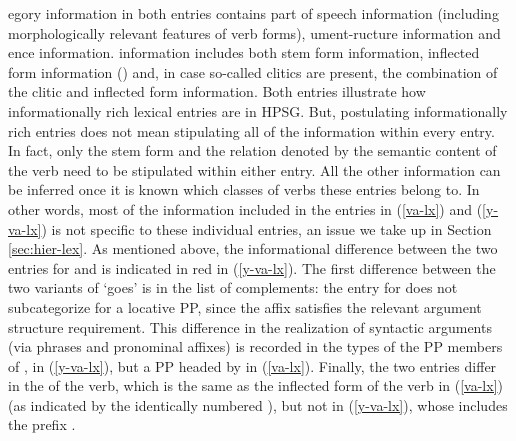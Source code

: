 \documentclass[output=paper]{langsci/langscibook}
\begin{document}
egory information in both entries contains part of speech information (including morphologically relevant features of verb forms), ument-ructure information and ence information.  information includes both stem form information, inflected form information () and, in case so-called clitics are present, the combination of the clitic and inflected form information. Both entries illustrate how informationally rich lexical entries are in HPSG. But, postulating informationally rich entries does not mean stipulating all of the information within every entry. In fact, only the stem form and the relation denoted by the semantic content of the verb  need to be stipulated within either entry. All the other information can be inferred once it is known which classes of verbs these entries belong to. In other words, most of the information included in the entries in (\ref{va-lx}) and (\ref{y-va-lx}) is not specific to these individual entries, an issue we take up in Section \ref{sec:hier-lex}.  As mentioned above, the informational difference between the two entries for  and  is indicated in red in (\ref{y-va-lx}). The first difference between the two variants of  `goes' is in the list of complements: the entry for  does not subcategorize for a locative PP, since the affix  satisfies the relevant argument structure requirement. This difference in the realization of syntactic arguments (via phrases and pronominal affixes) is recorded in the types of the PP members of ,  in (\ref{y-va-lx}), but a PP headed by  in (\ref{va-lx}). Finally, the two entries differ in the  of the verb, which is the same as the inflected form of the verb in (\ref{va-lx}) (as indicated by the identically numbered ), but not in (\ref{y-va-lx}), whose  includes the prefix .  
\end{document}
